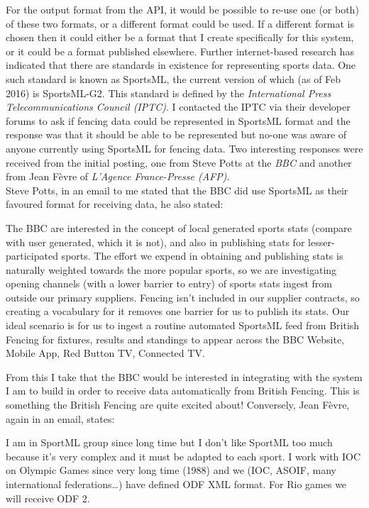 For the output format from the API, it would be possible to re-use one
(or both) of these two formats, or a different format could be used. If a
different format is chosen then it could either be a format that I create
specifically for this system, or it could be a format published elsewhere.
Further internet-based research has indicated that there are standards in
existence for representing sports data. One such standard is known as SportsML,
the current version of which (as of Feb 2016) is SportsML-G2. This standard is
defined by the \textit{International Press Telecommunications Council (IPTC)}. I
contacted the IPTC via their developer forums to ask if fencing data could be
represented in SportsML format and the response was that it should be able to be
represented but no-one was aware of anyone currently using SportsML for fencing
data. Two interesting responses were received from the initial posting, one from
Steve Potts at the \textit{BBC} and another from Jean F\`{e}vre of
\textit{L'Agence France-Presse (AFP)}.\\
Steve Potts, in an email to me stated that the BBC did use SportsML as their
favoured format for receiving data, he also stated:
\begin{displayquote}
The BBC are interested in the concept of local generated
sports stats (compare with user generated, which it is not), and also in publishing stats for
lesser-participated sports. The effort we expend in obtaining and publishing
stats is naturally weighted towards the more popular sports, so we are
investigating opening channels (with a lower barrier to entry) of sports stats
ingest from outside our primary suppliers. Fencing isn't included in our
supplier contracts, so creating a vocabulary for it removes one barrier for us
to publish its stats. Our ideal scenario is for us to ingest a routine automated
SportsML feed from British Fencing for fixtures, results and standings to appear
across the BBC Website, Mobile App, Red Button TV, Connected TV.
\citep{pottsemail20160202}
\end{displayquote}
From this I take that the BBC would be interested in integrating with the system
I am to build in order to receive data automatically from British Fencing. This
is something the British Fencing are quite excited about! Conversely, Jean
F\`{e}vre, again in an email, states:
\begin{displayquote}
I am in SportML group since long time but I don’t like SportML too much because
it’s very complex and it must be adapted to each sport.
I work with IOC on Olympic Games since very long time (1988) and we (IOC, ASOIF,
many international federations…) have defined ODF XML format.
For Rio games we will receive ODF 2. \citep{ferveemail20160203}
\end{displayquote}
